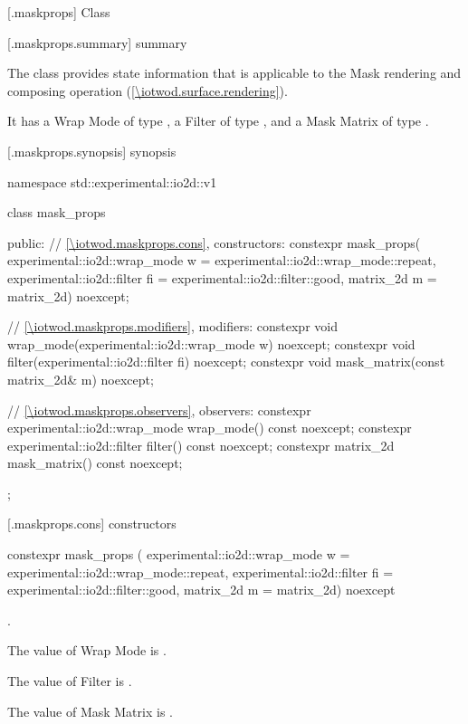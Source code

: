 
 [\iotwod.maskprops] {Class }

 [\iotwod.maskprops.summary] { summary}

\pnum
The  class provides state information that is applicable to the Mask rendering and composing operation (\ref{\iotwod.surface.rendering}).

\pnum
It has a Wrap Mode of type , a Filter of type , and a Mask Matrix of type .

 [\iotwod.maskprops.synopsis] { synopsis}

\begin{codeblock}
namespace std::experimental::io2d::v1 {
  class mask_props {
  public:
    // \ref{\iotwod.maskprops.cons}, constructors:
    constexpr mask_props(
      experimental::io2d::wrap_mode w = experimental::io2d::wrap_mode::repeat,
      experimental::io2d::filter fi = experimental::io2d::filter::good,
      matrix_2d m = matrix_2d{}) noexcept;

    // \ref{\iotwod.maskprops.modifiers}, modifiers:
    constexpr void wrap_mode(experimental::io2d::wrap_mode w) noexcept;
    constexpr void filter(experimental::io2d::filter fi) noexcept;
    constexpr void mask_matrix(const matrix_2d& m) noexcept;

    // \ref{\iotwod.maskprops.observers}, observers:
    constexpr experimental::io2d::wrap_mode wrap_mode() const noexcept;
    constexpr experimental::io2d::filter filter() const noexcept;
    constexpr matrix_2d mask_matrix() const noexcept;
  };
}
\end{codeblock}

 [\iotwod.maskprops.cons] { constructors}

\begin{itemdecl}
constexpr mask_props (
  experimental::io2d::wrap_mode w = experimental::io2d::wrap_mode::repeat,
  experimental::io2d::filter fi = experimental::io2d::filter::good,
  matrix_2d m = matrix_2d{}) noexcept    
\end{itemdecl}
\begin{itemdescr}
\onecolumn
\requires
{}.

\pnum
\effects
The value of Wrap Mode is .

\pnum
The value of Filter is .

\pnum
The value of Mask Matrix is .
\end{itemdescr}

